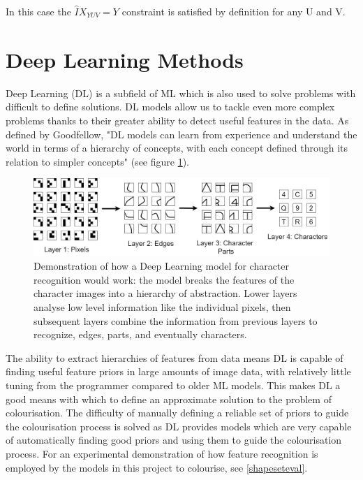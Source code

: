 \documentclass{l4proj}
\begin{document}
In this case the $\hat{I} X_{YUV} = Y$ constraint is satisfied by definition for any U and V.

\section{Deep Learning Methods}
\label{deeplearning}
Deep Learning (DL) is a subfield of ML which is also used to solve problems with difficult to define solutions. DL models allow us to tackle even more complex problems thanks to their greater ability to detect useful features in the data. As defined by Goodfellow, "DL models can learn from experience and understand the world in terms of a hierarchy of concepts, with each concept defined through its relation to simpler concepts"\cite{Goodfellow} (see figure \ref{fig:deeplearning}).
\begin{figure}[h]
    \centering
    \includegraphics[width=1.0\linewidth]{images/DeepLearning.png}    

    \caption{Demonstration of how a Deep Learning model for character recognition would work: the model breaks the features of the character images into a hierarchy of abstraction. Lower layers analyse low level information like the individual pixels, then subsequent layers combine the information from previous layers to recognize, edges, parts, and eventually characters.}

    \label{fig:deeplearning} 
\end{figure}

The ability to extract hierarchies of features from data means DL is capable of finding useful feature priors in large amounts of image data, with relatively little tuning from the programmer compared to older ML models. This makes DL a good means with which to define an approximate solution to the problem of colourisation. The difficulty of manually defining a reliable set of priors to guide the colourisation process is solved as DL provides models which are very capable of automatically finding good priors and using them to guide the colourisation process. For an experimental demonstration of how feature recognition is employed by the models in this project to colourise, see \ref{shapeseteval}.
\end{document}
